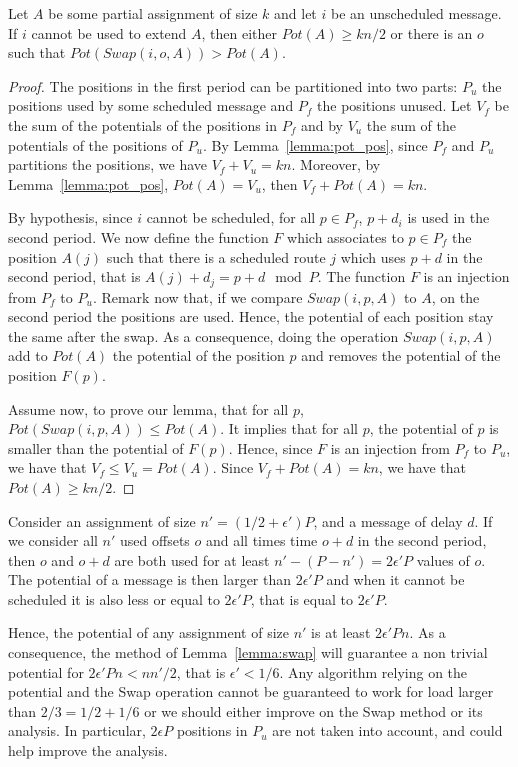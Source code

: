 \documentclass[a4paper,UKenglish,cleveref, autoref, thm-restate]{lipics-v2019}
\begin{document}
\begin{lemma}\label{lemma:swap}
Let $A$ be some partial assignment of size $k$ and let $i$ be an unscheduled message. If $i$ cannot be used to extend $A$, then either $Pot(A) \geq kn/2$ or there is an $o$ such that $Pot(Swap(i,o,A)) > Pot(A)$.
\end{lemma}

\begin{proof}
The positions in the first period can be partitioned into two parts: $P_{u}$ the positions used by some scheduled message and $P_{f}$ the positions unused.
Let $V_f$ be the sum of the potentials of the positions in $P_f$ and by $V_u$ the sum of the potentials of the positions of $P_u$. By Lemma~\ref{lemma:pot_pos}, since $P_f$ and $P_u$ partitions the positions, we have $V_f + V_u = kn$. Moreover, by Lemma~\ref{lemma:pot_pos}, $Pot(A) = V_u$, then $V_f + Pot(A) = kn$.

By hypothesis, since $i$ cannot be scheduled, for all $p \in P_{f}$, $p+d_i$ is used in the second period. We now define the function $F$ which associates to $p \in P_{f}$ the position $A(j)$ such that there is a scheduled route $j$ which uses $p+d$ in the second period, that is $A(j) + d_j = p + d \mod P$. The function $F$ is an injection from $P_{f}$ to $P_u$. Remark now that, if we compare $Swap(i,p,A)$ to $A$, on the second period the positions are used. Hence, the potential of each position stay the same after the swap. As a consequence, doing the operation $Swap(i,p,A)$ add to $Pot(A)$ the potential of the position $p$ and removes the potential of the position $F(p)$. 

Assume now, to prove our lemma, that for all $p$, $Pot(Swap(i,p,A)) \leq Pot(A)$. It implies that for all $p$, the potential of $p$ is smaller than the potential of $F(p)$. Hence, since $F$ is an injection from $P_f$ to $P_u$, we have that $V_f \leq V_u = Pot(A)$. Since $V_f + Pot(A) = kn$, we have that $Pot(A) \geq kn/2$.
\end{proof}

Consider an assignment of size $n' = (1/2 + \epsilon')P$, and a message of delay $d$.
If we consider all $n'$ used offsets $o$ and all times time $o+d$ in the second period, 
then $o$ and $o+d$ are both used for at least $n' - (P -n') = 2\epsilon' P$ values of $o$.
The potential of a message is then larger than $2\epsilon' P$ and when it cannot be scheduled
it is also less or equal to $2\epsilon' P$, that is equal to $2\epsilon' P$.

Hence, the potential of any assignment of size $n'$ is at least $2\epsilon' P n $. As a consequence, the method of Lemma~\ref{lemma:swap} will guarantee a non trivial potential for $2\epsilon' P n <  nn'/2$, that is $\epsilon' < 1/6$. Any algorithm relying on the potential and the Swap operation cannot be guaranteed to work for load larger than $2/3 = 1/2 + 1/6$ or we should either improve on the Swap method or its analysis. In particular, $2\epsilon P$ positions in $P_{u}$
are not taken into account, and could help improve the analysis.
\end{document}
